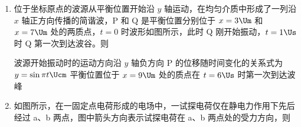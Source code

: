 \documentclass[\gkver]{gaokaozhenti}
\begin{document}
\begin{enumerate}
{C．电压表 V 测电阻 $R_{0}$ 两端的电压，滑动变阻器接入电路的电阻变小，根据串联电路分压规律可知电压表 V 的示数变大，故 C 正确；

D．根据 $P = \frac{U^{2}}{R}$ 可知副线圈回路的功率变大，根据理想变压器原副线圈功率相等可知变压器的输入功率变大，故 D 正确。

故选 CD。
}

\item
位于坐标原点的波源从平衡位置开始沿 $y$ 轴运动，在均匀介质中形成了一列沿 $x$ 轴正方向传播的简谐波，P 和 Q 是平衡位置分别位于 $x = 3 \Um$ 和 $x = 7 \Um$ 处的两质点，$t = 0$ 时波形如图所示，此时 Q 刚开始振动，$t = 1 \Us$ 时 Q 第一次到达波谷。则


{波源开始振动时的运动方向沿 $y$ 轴负方向}
{P 的位移随时间变化的关系式为 $y = \sin \pi t \Ucm$}
{平衡位置位于 $x = 9 \Um$ 处的质点在 $t = 6 \Us$ 时第一次到达波峰}


\item
如图所示，在一固定点电荷形成的电场中，一试探电荷仅在静电力作用下先后经过 a、b 两点，图中箭头方向表示试探电荷在 a、b 两点处的受力方向，则


\end{enumerate}
\end{document}
